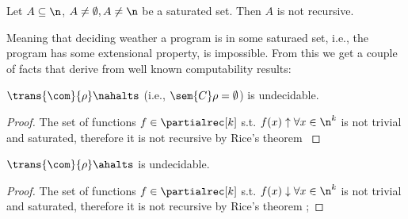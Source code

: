 \begin{theorem}
  Let \(A\subseteq \n\), \(A\neq \emptyset, A \neq \n\) be a saturated
  set. Then \(A\) is not recursive.
\end{theorem}

Meaning that deciding weather a program is in some saturaed set, i.e.,
the program has some extensional property, is impossible.  From this
we get a couple of facts that derive from well known computability
results:

\begin{corollary}
  \(\trans{\com}{\rho} \nahalts\) (i.e., \(\sem{C}\rho = \emptyset\)) is
  undecidable.
\end{corollary}

\begin{proof}
  The set of functions \(f\in \partialrec[k]\) s.t.
  \(f(x) \uparrow \forall x \in \n^k\) is not trivial and saturated,
  therefore it is not recursive by Rice's theorem
  \cite{rice1953classes}
\end{proof}

\begin{corollary}
  \(\trans{\com}{\rho} \ahalts\) is undecidable.
\end{corollary}
\begin{proof}
  The set of functions \(f\in \partialrec[k]\) s.t.
  \(f(x) \downarrow \forall x \in \n^k\) is not trivial and saturated,
  therefore it is not recursive by Rice's theorem
  \cite{rice1953classes};
\end{proof}